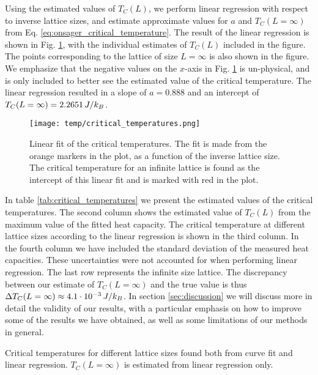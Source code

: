 Using the estimated values of $T_C(L)$, we perform linear regression with respect to inverse lattice sizes, and estimate approximate values for $a$ and $T_C(L=\infty)$ from Eq. \eqref{eq:onsager_critical_temperature}. The result of the linear regression is shown in Fig. \ref{fig:critical_temperatures}, with the individual estimates of $T_C(L)$ included in the figure. The points corresponding to the lattice of size $L=\infty$ is also shown in the figure. We emphasize that the negative values on the $x$-axis in Fig. \ref{fig:critical_temperatures} is un-physical, and is only included to better see the estimated value of the critical temperature. The linear regression resulted in a slope of $a=0.888$ and an intercept of $T_C(L=\infty)=2.2651\,J/k_B$.     
\begin{figure}[!ht]
    \texttt{[image: temp/critical\_temperatures.png]} 
    \caption{Linear fit of the critical temperatures. The fit is made from the orange markers in the plot, as a function of the inverse lattice size. The critical temperature for an infinite lattice is found as the intercept of this linear fit and is marked with red in the plot. }
    \label{fig:critical_temperatures}
\end{figure} 

In table \ref{tab:critical_temperatures} we present the estimated values of the critical temperatures. The second column shows the estimated value of $T_C(L)$ from the maximum value of the fitted heat capacity. The critical temperature at different lattice sizes according to the linear regression is shown in the third column. In the fourth column we have included the standard deviation of the measured heat capacities. These uncertainties were not accounted for when performing linear regression. The last row represents the infinite size lattice. The discrepancy between our estimate of $T_C(L=\infty)$ and the true value is thus $\Delta T_C(L=\infty)\approx4.1\cdot10^{-3}\,J/k_B$. In section \ref{sec:discussion} we will discuss more in detail the validity of our results, with a particular emphasis on how to improve some of the results we have obtained, as well as some limitations of our methods in general.    
\begin{table}[!ht]
    
    \caption{Critical temperatures for different lattice sizes found both from curve fit and linear regression. $T_C(L=\infty)$ is estimated from linear regression only.}
    \label{tab:critical_temperatures}
\end{table}

